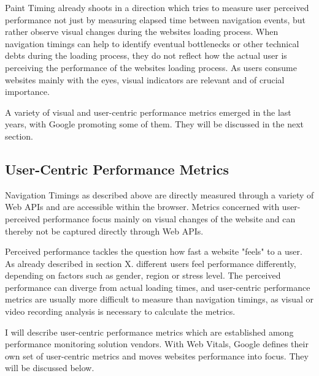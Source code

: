 
Paint Timing already shoots in a direction which tries to measure user perceived performance not just by measuring elapsed time between navigation events, but rather observe visual changes during the websites loading process.
When navigation timings can help to identify eventual bottlenecks or other technical debts during the loading process, they do not reflect how the actual user is perceiving the performance of the websites loading process.
As users consume websites mainly with the eyes, visual indicators are relevant and of crucial importance.

A variety of visual and user-centric performance metrics emerged in the last years, with Google promoting some of them.
They will be discussed in the next section.






\subsection{User-Centric Performance Metrics}


Navigation Timings as described above are directly measured through a variety of Web APIs and are accessible within the browser.
Metrics concerned with user-perceived performance focus mainly on visual changes of the website and can thereby not be captured directly through Web APIs.

Perceived performance tackles the question how fast a website "feels" to a user.
As already described in section X. different users feel performance differently, depending on factors such as gender, region or stress level.
The perceived performance can diverge from actual loading times, and user-centric performance metrics are usually more difficult to measure than navigation timings, as visual or video recording analysis is necessary to calculate the metrics. %

I will describe user-centric performance metrics which are established among performance monitoring solution vendors.
With Web Vitals, Google defines their own set of user-centric metrics and moves websites performance into focus.
They will be discussed below.



